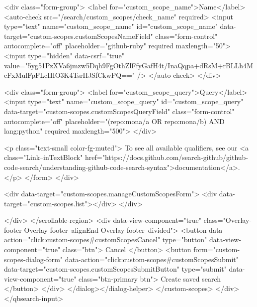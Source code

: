           <div class="form-group">
            <label for="custom_scope_name">Name</label>
            <auto-check src="/search/custom_scopes/check_name" required>
              <input
                type="text"
                name="custom_scope_name"
                id="custom_scope_name"
                data-target="custom-scopes.customScopesNameField"
                class="form-control"
                autocomplete="off"
                placeholder="github-ruby"
                required
                maxlength="50">
              <input type="hidden" data-csrf="true" value="5yg51PzXVa6jmzw5Dqh9FgOthZlFfyGafH4t/InaQqpa+dRsM+rBLLh4McFxMulFpFLcHIO3K4TsrHJSfCkwPQ==" />
            </auto-check>
          </div>

          <div class="form-group">
            <label for="custom_scope_query">Query</label>
            <input
              type="text"
              name="custom_scope_query"
              id="custom_scope_query"
              data-target="custom-scopes.customScopesQueryField"
              class="form-control"
              autocomplete="off"
              placeholder="(repo:mona/a OR repo:mona/b) AND lang:python"
              required
              maxlength="500">
          </div>

          <p class="text-small color-fg-muted">
            To see all available qualifiers, see our <a class="Link--inTextBlock" href="https://docs.github.com/search-github/github-code-search/understanding-github-code-search-syntax">documentation</a>.
          </p>
</form>        </div>

        <div data-target="custom-scopes.manageCustomScopesForm">
          <div data-target="custom-scopes.list"></div>
        </div>

</div>
      </scrollable-region>
      <div data-view-component="true" class="Overlay-footer Overlay-footer--alignEnd Overlay-footer--divided">          <button data-action="click:custom-scopes#customScopesCancel" type="button" data-view-component="true" class="btn">    Cancel
</button>
          <button form="custom-scopes-dialog-form" data-action="click:custom-scopes#customScopesSubmit" data-target="custom-scopes.customScopesSubmitButton" type="submit" data-view-component="true" class="btn-primary btn">    Create saved search
</button>
</div>
</dialog></dialog-helper>
    </custom-scopes>
  </div>
</qbsearch-input>


